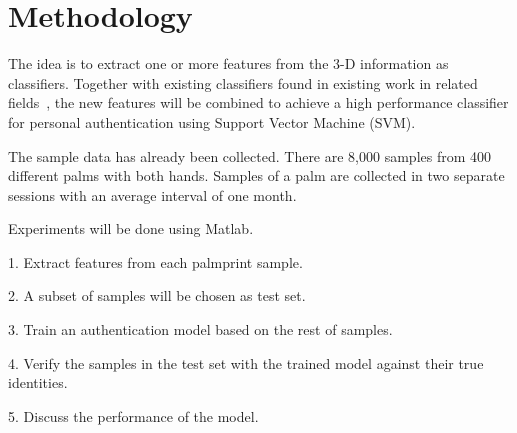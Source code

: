 
\chapter{Methodology\label{ch:methodology}}

The idea is to extract one or more features from the 3-D information as classifiers. Together with existing classifiers found in existing work in related fields~\cite{Xu:2004tt,Yan:2007fv,Samir:2006vj}, the new features will be combined to achieve a high performance classifier for personal authentication using Support Vector Machine (SVM).

The sample data has already been collected. There are 8,000 samples from 400 different palms with both hands. Samples of a palm are collected in two separate sessions with an average interval of one month.

Experiments will be done using Matlab.

1. Extract features from each palmprint sample.

2. A subset of samples will be chosen as test set.

3. Train an authentication model based on the rest of samples.

4. Verify the samples in the test set with the trained model against their true identities.

5. Discuss the performance of the model.




